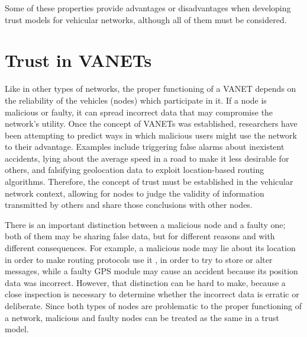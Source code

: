 Some of these properties provide advantages or disadvantages when developing trust models for vehicular networks, although all of them must be considered.

\section{Trust in VANETs}
\label{section:trustvanet}
Like in other types of networks, the proper functioning of a VANET depends on the reliability of the vehicles (nodes) which participate in it.
If a node is malicious or faulty, it can spread incorrect data that may compromise the network's utility.
Once the concept of VANETs was established, researchers have been attempting to predict ways in which malicious users might use the network to their advantage.
Examples include triggering false alarms about inexistent accidents, lying about the average speed in a road to make it less desirable for others, and falsifying geolocation data to exploit location-based routing algorithms.
Therefore, the concept of trust must be established in the vehicular network context, allowing for nodes to judge the validity of information transmitted by others and share those conclusions with other nodes.

There is an important distinction between a malicious node and a faulty one; both of them may be sharing false data, but for different reasons and with different consequences.
For example, a malicious node may lie about its location in order to make routing protocols use it \cite{leinmuller2005influence}, in order to try to store or alter messages, while a faulty GPS module may cause an accident because its position data was incorrect.
However, that distinction can be hard to make, because a close inspection is necessary to determine whether the incorrect data is erratic or deliberate.
Since both types of nodes are problematic to the proper functioning of a network, malicious and faulty nodes can be treated as the same in a trust model.


